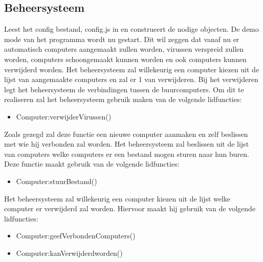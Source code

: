 \documentclass[a4paper,oneside]{report}
\begin{document}
\subsection{Beheersysteem}
 Leest het config bestand, config.js in en construeert de nodige objecten.
 De demo mode van het programma wordt nu gestart. Dit wil zeggen dat vanaf nu er automatisch computers aangemaakt zullen worden, virussen verspreid zullen worden, computers schoongemaakt kunnen worden en ook computers kunnen verwijderd worden.
 Het beheersysteem zal willekeurig een computer kiezen uit de lijst van aangemaakte computers en zal er 1 van verwijderen. Bij het verwijderen legt het beheersysteem de verbindingen tussen de buurcomputers. Om dit te realiseren zal het beheersysteem gebruik maken van de volgende lidfuncties:
\begin{itemize}
    \item Computer:verwijderVirussen()
\end{itemize}
 Zoals gezegd zal deze functie een nieuwe computer aanmaken en zelf beslissen met wie hij verbonden zal worden.
 Het beheersysteem zal beslissen uit de lijst van computers welke computers er een bestand mogen sturen naar hun buren. Deze functie maakt gebruik van de volgende lidfuncties:
\begin{itemize}
    \item Computer:stuurBestand()
\end{itemize}
 Het beheersysteem zal willekeurig een computer kiezen uit de lijst welke computer er verwijderd zal worden. Hiervoor maakt hij gebruik van de volgende lidfuncties:
\begin{itemize}
    \item Computer:geefVerbondenComputers()
    \item Computer:kanVerwijderdworden()
\end{itemize}
\end{document}
